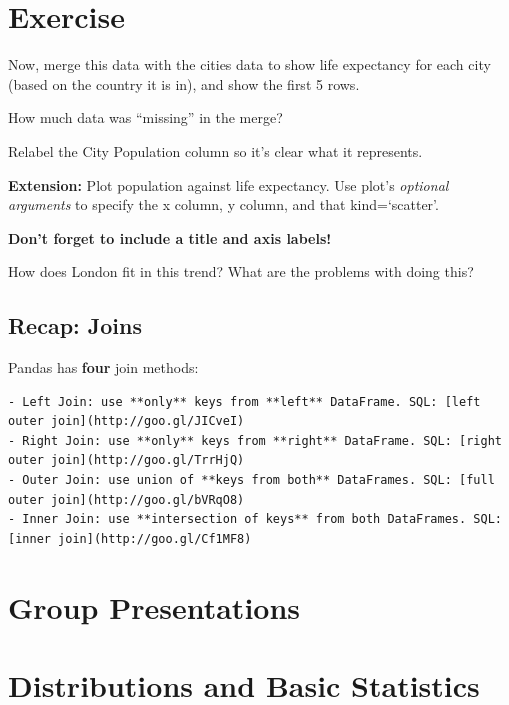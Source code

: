 \documentclass[
  letterpaper,
  DIV=11,
  numbers=noendperiod]{scrreprt}
\begin{document}

\hypertarget{exercise-17}{%
\chapter{Exercise}\label{exercise-17}}

Now, merge this data with the cities data to show life expectancy for
each city (based on the country it is in), and show the first 5 rows.

How much data was ``missing'' in the merge?

Relabel the City Population column so it's clear what it represents.

\textbf{Extension:} Plot population against life expectancy. Use plot's
\emph{optional arguments} to specify the x column, y column, and that
kind=`scatter'.

\textbf{Don't forget to include a title and axis labels!}

How does London fit in this trend? What are the problems with doing
this?

\hypertarget{recap-joins}{%
\section{Recap: Joins}\label{recap-joins}}

Pandas has \textbf{four} join methods:

\begin{verbatim}
- Left Join: use **only** keys from **left** DataFrame. SQL: [left outer join](http://goo.gl/JICveI)
- Right Join: use **only** keys from **right** DataFrame. SQL: [right outer join](http://goo.gl/TrrHjQ)
- Outer Join: use union of **keys from both** DataFrames. SQL: [full outer join](http://goo.gl/bVRqO8)
- Inner Join: use **intersection of keys** from both DataFrames. SQL: [inner join](http://goo.gl/Cf1MF8)
\end{verbatim}


\hypertarget{group-presentations}{%
\chapter{Group Presentations}\label{group-presentations}}


\hypertarget{distributions-and-basic-statistics}{%
\chapter{Distributions and Basic
Statistics}\label{distributions-and-basic-statistics}}
\end{document}
